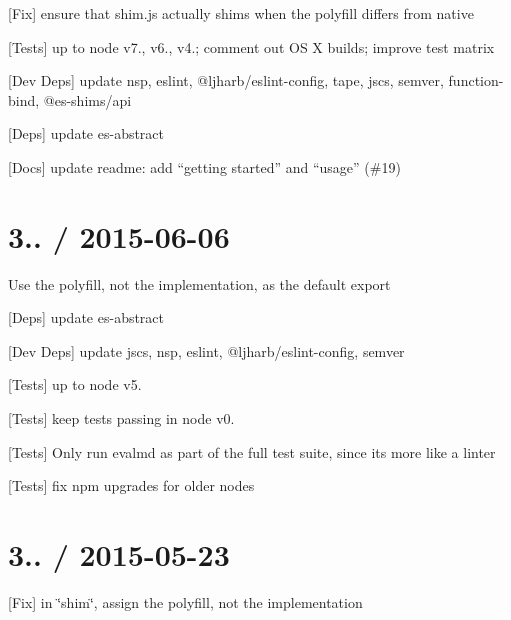 
\begin{DoxyItemize}
\item \mbox{[}Fix\mbox{]} ensure that {\ttfamily shim.\+js} actually shims when the polyfill differs from native
\item \mbox{[}Tests\mbox{]} up to {\ttfamily node} {\ttfamily v7.}, {\ttfamily v6.}, {\ttfamily v4.}; comment out OS X builds; improve test matrix
\item \mbox{[}Dev Deps\mbox{]} update {\ttfamily nsp}, {\ttfamily eslint}, {\ttfamily @ljharb/eslint-\/config}, {\ttfamily tape}, {\ttfamily jscs}, {\ttfamily semver}, {\ttfamily function-\/bind}, {\ttfamily @es-\/shims/api}
\item \mbox{[}Deps\mbox{]} update {\ttfamily es-\/abstract}
\item \mbox{[}Docs\mbox{]} update readme\+: add “getting started” and “usage” (\#19)
\end{DoxyItemize}

\section*{3.. / 2015-\/06-\/06 }


\begin{DoxyItemize}
\item Use the polyfill, not the implementation, as the default export
\item \mbox{[}Deps\mbox{]} update {\ttfamily es-\/abstract}
\item \mbox{[}Dev Deps\mbox{]} update {\ttfamily jscs}, {\ttfamily nsp}, {\ttfamily eslint}, {\ttfamily @ljharb/eslint-\/config}, {\ttfamily semver}
\item \mbox{[}Tests\mbox{]} up to {\ttfamily node} {\ttfamily v5.}
\item \mbox{[}Tests\mbox{]} keep tests passing in {\ttfamily node} {\ttfamily v0.}
\item \mbox{[}Tests\mbox{]} Only run {\ttfamily evalmd} as part of the full test suite, since it\textquotesingle{}s more like a linter
\item \mbox{[}Tests\mbox{]} fix npm upgrades for older nodes
\end{DoxyItemize}

\section*{3.. / 2015-\/05-\/23 }


\begin{DoxyItemize}
\item \mbox{[}Fix\mbox{]} in \char`\"{}shim\char`\"{}, assign the polyfill, not the implementation
\end{DoxyItemize}

